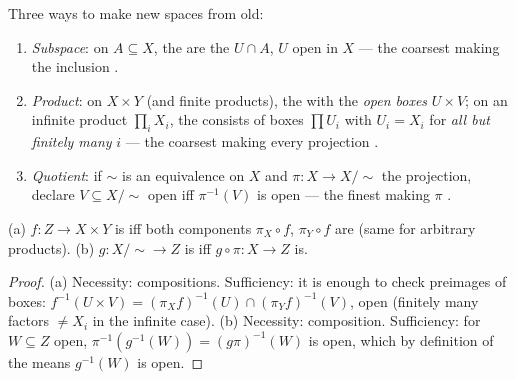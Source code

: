 \begin{definition}\label{def:b3:topology:constructions}
Three ways to make new spaces from old:
\begin{enumerate}
  \item \emph{Subspace}: on $A \subseteq X$, the  are
        the $U \cap A$, $U$ open in $X$ --- the coarsest
         making the inclusion .
  \item \emph{Product}: on $X \times Y$ (and finite products),
        the  with  the \emph{open boxes} $U \times
        V$; on an infinite product $\prod_i X_i$, the 
        consists of boxes $\prod U_i$ with $U_i = X_i$ for
        \emph{all but finitely many} $i$ --- the coarsest
         making every projection .
  \item \emph{Quotient}: if $\sim$ is an equivalence on $X$ and
        $\pi\colon X \to X/{\sim}$ the projection, declare $V
        \subseteq X/{\sim}$ open iff $\pi^{-1}(V)$ is open ---
        the finest  making $\pi$ .
\end{enumerate}
\end{definition}

\begin{proposition}
\label{prop:b3:topology:universal}
(a) $f \colon Z \to X \times Y$ is  iff both
components $\pi_X \circ f$, $\pi_Y \circ f$ are (same for
arbitrary products).
(b) $g \colon X/{\sim} \to Z$ is  iff $g \circ \pi
\colon X \to Z$ is.
\end{proposition}

\begin{proof}
(a) Necessity: compositions. Sufficiency: it is enough to check
preimages of  boxes: $f^{-1}(U \times V) = (\pi_Xf)^{-1}(U)
\cap (\pi_Yf)^{-1}(V)$, open (finitely many factors $\neq X_i$
in the infinite case). (b) Necessity: composition. Sufficiency:
for $W \subseteq Z$ open, $\pi^{-1}(g^{-1}(W)) = (g\pi)^{-1}(W)$
is open, which by definition of the  means
$g^{-1}(W)$ is open.
\end{proof}

